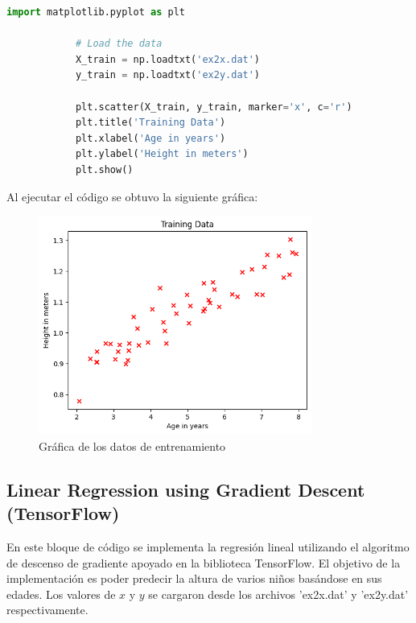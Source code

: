 \documentclass{article}
\begin{document}
    \begin{lstlisting}[language=Python, caption={Gráfica de los datos de entrenamiento},label={lst:PlotTrainingData}]
            import matplotlib.pyplot as plt

            # Load the data
            X_train = np.loadtxt('ex2x.dat')
            y_train = np.loadtxt('ex2y.dat')

            plt.scatter(X_train, y_train, marker='x', c='r')
            plt.title('Training Data')
            plt.xlabel('Age in years')
            plt.ylabel('Height in meters')
            plt.show()
    \end{lstlisting}
    \noindent
    Al ejecutar el código se obtuvo la siguiente gráfica:
    \begin{figure}[h]
        \centering
        \includegraphics[width=0.8\textwidth]{img/plot_training_data}
        \caption{Gráfica de los datos de entrenamiento}
        \label{fig:plot_training_data}
    \end{figure}
    \clearpage

    \subsection{Linear Regression using Gradient Descent (TensorFlow)}\label{subsec:Gradient-Descent}
    \noindent
    En este bloque de código se implementa la regresión lineal utilizando el algoritmo de descenso de gradiente apoyado en la biblioteca TensorFlow.
    El objetivo de la implementación es poder predecir la altura de varios niños basándose en sus edades.
    Los valores de $x$ y $y$ se cargaron desde los archivos 'ex2x.dat' y 'ex2y.dat' respectivamente.
\end{document}
